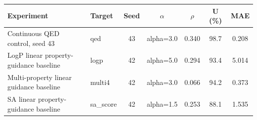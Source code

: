 \begin{tabular}{l l c c c c c}
\toprule
Experiment & Target & Seed & $\alpha$ & $\rho$ & U (\%) & MAE \\
\midrule
Continuous QED control, seed 43 & qed & 43 & alpha=3.0 & 0.340 & 98.7 & 0.208 \\
LogP linear property-guidance baseline & logp & 42 & alpha=5.0 & 0.294 & 93.4 & 5.014 \\
Multi-property linear guidance baseline & multi4 & 42 & alpha=3.0 & 0.066 & 94.2 & 0.373 \\
SA linear property-guidance baseline & sa\_score & 42 & alpha=1.5 & 0.253 & 88.1 & 1.535 \\
\bottomrule
\end{tabular}
